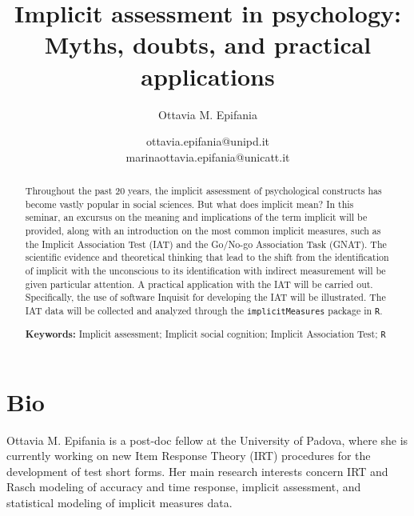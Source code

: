 \documentclass[]{article}
\title{Implicit assessment in psychology: Myths, doubts, and practical applications}
\author{Ottavia M. Epifania}
\date{ottavia.epifania@unipd.it \\ marinaottavia.epifania@unicatt.it}
\begin{document}
\maketitle

\begin{abstract}
Throughout the past 20 years, the implicit assessment of psychological constructs has become vastly popular in social sciences. But what does implicit mean? In this seminar, an excursus on the meaning and implications of the term implicit will be provided, along with an introduction on the most common implicit measures, such as the Implicit Association Test (IAT) and the Go/No-go Association Task (GNAT). 
The scientific evidence and theoretical thinking that lead to the shift from the identification of implicit with the unconscious to its identification with indirect measurement will be given particular attention.
A practical application with the IAT will be carried out. Specifically, the use of software Inquisit for developing  the IAT will be illustrated.  The IAT data  will be collected and analyzed through the \texttt{implicitMeasures} package in \texttt{R}.

\textbf{Keywords:} Implicit assessment; Implicit social cognition; Implicit Association Test; \texttt{R}
\end{abstract}

\section*{Bio}
Ottavia M. Epifania is a post-doc fellow at the University of Padova, where she is currently working on new Item Response Theory (IRT) procedures for the development of test short forms. 
Her main research interests concern IRT and Rasch modeling of accuracy and time response, implicit assessment, and statistical modeling of implicit measures data.
\end{document}
